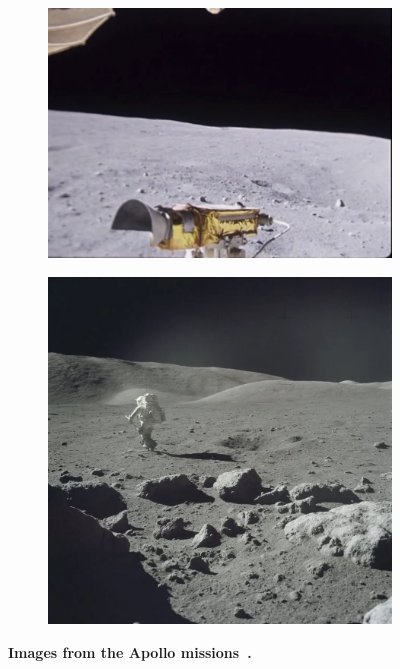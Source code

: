 \begin{figure}[b]
	\vspace{-1em}
	\centering
	\begin{subfigure}[b]{0.55\linewidth}
		\includegraphics[width=\linewidth,trim=0 0.5 0.5em 0,clip]{figures/rover2.png}
	\end{subfigure}
	\begin{subfigure}[b]{0.395\linewidth}
		\includegraphics[width=\linewidth,trim=0 0.5 0.5em 0,clip]{figures/surface_astronaut.png}
	\end{subfigure}
	\caption{\bfseries Images from the Apollo missions~\cite{nasa_apollo_2017}.}
	\label{fig:sample_apollo}
\end{figure}

